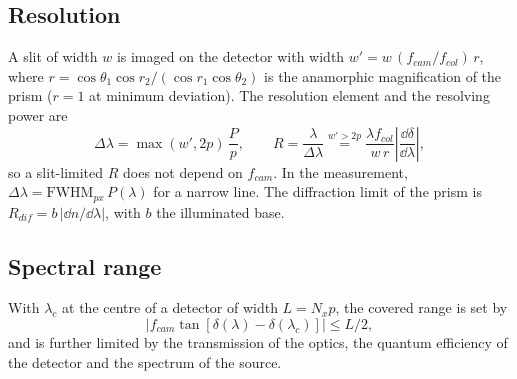 \subsection{Resolution}
A slit of width $w$ is imaged on the detector with width $w'=w\,(f_{cam}/f_{col})\,r$, where $r=\cos\theta_1\cos r_2/(\cos r_1\cos\theta_2)$ is the anamorphic magnification of the prism ($r=1$ at minimum deviation). The resolution element and the resolving power are
\begin{equation}
\Delta\lambda=\max(w',2p)\,\frac{P}{p},\qquad
R=\frac{\lambda}{\Delta\lambda}\overset{w'>2p}{=}\frac{\lambda f_{col}}{w\,r}\left|\frac{\dd\delta}{\dd\lambda}\right|,
\label{eq:res}
\end{equation}
so a slit-limited $R$ does not depend on $f_{cam}$. In the measurement, $\Delta\lambda=\mathrm{FWHM}_{px}\,P(\lambda)$ for a narrow line. The diffraction limit of the prism is $R_{dif}=b\,|\dd n/\dd\lambda|$, with $b$ the illuminated base.

\subsection{Spectral range}
With $\lambda_c$ at the centre of a detector of width $L=N_xp$, the covered range is set by
\begin{equation}
\big|f_{cam}\tan[\delta(\lambda)-\delta(\lambda_c)]\big|\le L/2,
\label{eq:range}
\end{equation}
and is further limited by the transmission of the optics, the quantum efficiency of the detector and the spectrum of the source.